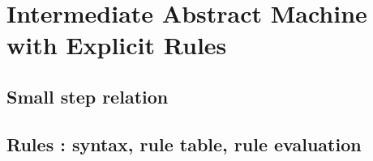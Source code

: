 \documentclass{article}
\begin{document}
\ottdefnsAbstractHighLevelSmallStep


\newpage
\section*{Intermediate Abstract Machine
  with Explicit Rules}

\subsection*{Small step relation}

\ottdefnsAbstractExplicitSmallStep

\clearpage
\subsection*{Rules : syntax, rule table, rule evaluation}

\ottgrammartabular{
\ottLE\ottinterrule
\ottBE\ottinterrule
\ottRHS\ottinterrule
}

\ottfundefnsRule
\end{document}
